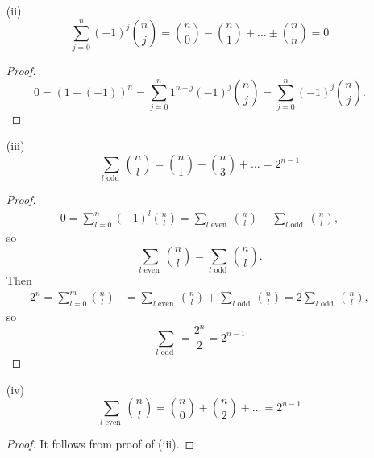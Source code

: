 \documentclass{article}
\begin{document}
\begin{enumerate}
\begin{enumerate}
\begin{proof}
			Next, suppose that for some $n \ge 1$, $\sum_{j=0}^{n} = 2^n$. Then
			\begin{align*}
				\sum_{j=0}^{n+1}\binom{n+1}{j} &= \sum_{j=0}^{n+1}\left(\binom{n}{j} + \binom{n}{j-1}\right) = \binom{n}{0} + \sum_{j=1}^{n}\binom{n}{j} + \sum_{j=1}^{n}\binom{n}{j - 1} + \binom{n}{n} \\&=\sum_{j=0}^{n}\binom{n}{j} + \sum_{j=0}^{n}\binom{n}{j} = 2^n + 2^n = 2^{n+1}.
			\end{align*}
		\end{proof}
		\begin{proof}
			(alternative) \[ 2^n = (1 + 1)^n = \sum_{j=0}^{n}1^{n - j}1^j\binom{n}{j} = \sum_{j=0}^{n}\binom{n}{j} \]
		\end{proof}
		\item[(ii)] \[ \sum_{j=0}^{n}(-1)^j\binom{n}{j} = \binom{n}{0} - \binom{n}{1} + \dots \pm \binom{n}{n} = 0 \]
		\begin{proof}
			\[ 0 = (1 + (-1))^n = \sum_{j=0}^{n}1^{n-j}(-1)^j\binom{n}{j} = \sum_{j=0}^{n}(-1)^j\binom{n}{j}. \]
		\end{proof}
		\item[(iii)] \[ \sum_{l\text{ odd }}\binom{n}{l} = \binom{n}{1} + \binom{n}{3} + \dots = 2^{n-1} \]
		\begin{proof}
			\begin{align*}
				0 = \sum_{l=0}^{n}(-1)^l\binom{n}{l} = \sum_{l\text{ even }}\binom{n}{l} - \sum_{l\text{ odd }}\binom{n}{l},
			\end{align*} so \[ \sum_{l\text{ even }}\binom{n}{l} = \sum_{l\text{ odd }}\binom{n}{l}. \] Then
			\begin{align*}
				2^n = \sum_{l=0}^{m}\binom{n}{l} &= \sum_{l\text{ even }}\binom{n}{l} + \sum_{l\text{ odd }}\binom{n}{l} = 2\sum_{l\text{ odd }}\binom{n}{l},
			\end{align*} so \[ \sum_{l\text{ odd }} = \frac{2^n}{2} = 2^{n-1} \]
		\end{proof}
		\item[(iv)] \[ \sum_{l\text{ even }}\binom{n}{l} = \binom{n}{0} + \binom{n}{2} + \dots = 2^{n-1} \]
		\begin{proof}
			It follows from proof of (iii).
		\end{proof}
	\end{enumerate}
\end{enumerate}
\end{document}
